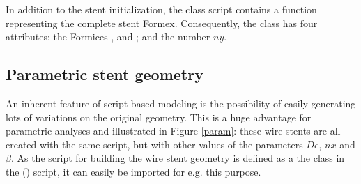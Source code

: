 In addition to the stent initialization, the  class script contains a function  representing the complete stent Formex. Consequently, the  class has four attributes: the Formices ,  and ; and the number $ny$.
%


%
\subsection{Parametric stent geometry}
%
An inherent feature of script-based modeling is the possibility of easily generating lots of variations on the original geometry. This is a huge advantage for parametric analyses and illustrated in Figure \ref{param}: these wire stents are all created with the same script, but with other values of the parameters $De$, $nx$ and $\beta$. As the script for building the wire stent geometry is defined as a the  class in the () script, it can easily be imported for e.g. this purpose.

